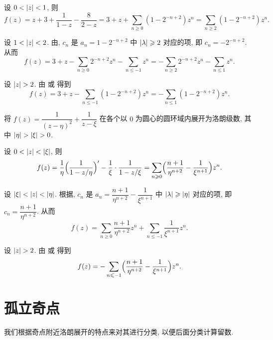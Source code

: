 \begin{solutionenum}
  \item 设 $0<\abs{z}<1$, 则
  \[
      f(z)
    =z+3+\frac1{1-z}-\frac8{2-z}
    =3+z+\sum_{n\ge 0}(1-2^{-n+2})z^n
    =\sum_{n\ge 2}(1-2^{-n+2})z^n.
  \]
  \item 设 $1<\abs{z}<2$. 由, $c_n$ 是 $a_n=1-2^{-n+2}$ 中 $\abs{\lambda}\ge 2$ 对应的项, 即 $c_n=-2^{-n+2}$. 从而
  \[
      f(z)
    =3+z-\sum_{n\ge0}2^{-n+2}z^n-\sum_{n\le-1}z^n
    =-\sum_{n\ge 2}2^{-n+2}z^n-\sum_{n\le 1}z^n.
  \]
  \item 设 $\abs{z}>2$. 由 或 得到
  \[
      f(z)
    =3+z-\sum_{n\le -1}(1-2^{-n+2})z^n
    =-\sum_{n\le1}(1-2^{-n+2})z^n.
  \]
\end{solutionenum}

\begin{example}
  将 $f(z)=\dfrac1{(z-\eta)^2}+\dfrac1{z-\xi}$ 在各个以 $0$ 为圆心的圆环域内展开为洛朗级数, 其中 $\abs{\eta}>\abs{\xi}>0$. 
\end{example}

\begin{solutionenum}
  \item 设 $0<\abs{z}<\abs{\xi}$, 则
  \[
      f(z)
    =\frac1{\eta}\Bigl(\frac1{1-z/\eta}\Bigr)'-\frac1\xi\cdot\frac1{1-z/\xi}
    =\sum_{n\ge 0}\Bigl(\frac{n+1}{\eta^{n+2}}-\frac1{\xi^{n+1}}\Bigr)z^n.
  \]
  \item 设 $\abs{\xi}<\abs{z}<\abs{\eta}$. 根据, $c_n$ 是 $a_n=\dfrac{n+1}{\eta^{n+2}}-\dfrac1{\xi^{n+1}}$ 中 $\abs{\lambda}\ge\abs{\eta}$ 对应的项, 即 $c_n=\dfrac{n+1}{\eta^{n+2}}$. 从而
  \[
      f(z)
    =\sum_{n\ge 0}\frac{n+1}{\eta^{n+2}}z^n+\sum_{n\le -1}\frac1{\xi^{n+1}}z^n.
  \]
  \item 设 $\abs{z}>2$. 由 或 得到
  \[
      f(z)
    =-\sum_{n\le -1}\Bigl(\frac{n+1}{\eta^{n+2}}-\frac1{\xi^{n+1}}\Bigr)z^n.
  \]
\end{solutionenum}



\section{孤立奇点}

我们根据奇点附近洛朗展开的特点来对其进行分类, 以便后面分类计算留数.

